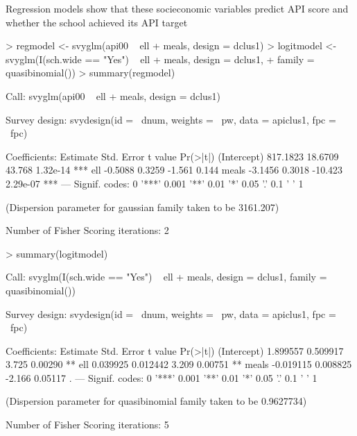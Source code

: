 \documentclass{article}
\begin{document}
Regression models show that these socieconomic variables predict API score and whether the school achieved its API target
\begin{Schunk}
\begin{Sinput}
> regmodel <- svyglm(api00 ~ ell + meals, design = dclus1)
> logitmodel <- svyglm(I(sch.wide == "Yes") ~ ell + meals, design = dclus1, 
+     family = quasibinomial())
> summary(regmodel)
\end{Sinput}
\begin{Soutput}
Call:
svyglm(api00 ~ ell + meals, design = dclus1)

Survey design:
svydesign(id = ~dnum, weights = ~pw, data = apiclus1, fpc = ~fpc)

Coefficients:
            Estimate Std. Error t value Pr(>|t|)    
(Intercept) 817.1823    18.6709  43.768 1.32e-14 ***
ell          -0.5088     0.3259  -1.561    0.144    
meals        -3.1456     0.3018 -10.423 2.29e-07 ***
---
Signif. codes:  0 '***' 0.001 '**' 0.01 '*' 0.05 '.' 0.1 ' ' 1 

(Dispersion parameter for gaussian family taken to be 3161.207)

Number of Fisher Scoring iterations: 2
\end{Soutput}
\begin{Sinput}
> summary(logitmodel)
\end{Sinput}
\begin{Soutput}
Call:
svyglm(I(sch.wide == "Yes") ~ ell + meals, design = dclus1, family = quasibinomial())

Survey design:
svydesign(id = ~dnum, weights = ~pw, data = apiclus1, fpc = ~fpc)

Coefficients:
             Estimate Std. Error t value Pr(>|t|)   
(Intercept)  1.899557   0.509917   3.725  0.00290 **
ell          0.039925   0.012442   3.209  0.00751 **
meals       -0.019115   0.008825  -2.166  0.05117 . 
---
Signif. codes:  0 '***' 0.001 '**' 0.01 '*' 0.05 '.' 0.1 ' ' 1 

(Dispersion parameter for quasibinomial family taken to be 0.9627734)

Number of Fisher Scoring iterations: 5
\end{Soutput}
\end{Schunk}
\end{document}
